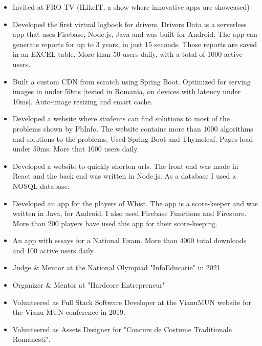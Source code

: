 \begin{itemize}
    \item Invited at PRO TV (ILikeIT, a show where innovative apps are showcased)
\end{itemize}

\begin{itemize}
    \item Developed the first virtual logbook for drivers.
    Drivers Data is a serverless app that uses Firebase, Node.js, Java and was built for Android.
    The app can generate reports for up to 3 years, in just 15 seconds.
    Those reports are saved in an EXCEL table.
    More than 50 users daily, with a total of 1000 active users.
\end{itemize}
\begin{itemize}
    \item Built a custom CDN from scratch using Spring Boot.
    Optimized for serving images in under 50ms [tested in Romania, on devices with latency under 10ms].
    Auto-image resizing and smart cache.
\end{itemize}
\begin{itemize}
    \item Developed a website where students can find solutions to most of the problems shown by PbInfo.
    The website contains more than 1000 algorithms and solutions to the problems.
    Used Spring Boot and Thymeleaf.
    Pages load under 50ms.
    More that 1000 users daily.
\end{itemize}
\begin{itemize}
    \item Developed a website to quickly shorten urls.
    The front end was made in React and the back end was written in Node.js.
    As a database I used a NOSQL database.
\end{itemize}
\begin{itemize}
    \item Developed an app for the players of Whist.
    The app is a score-keeper and was written in Java, for Android.
    I also used Firebase Functions and Firestore.
    More than 200 players have used this app for their score-keeping.
\end{itemize}
\begin{itemize}
    \item An app with essays for a National Exam.
    More than 4000 total downloads and 100 active users daily.
\end{itemize}
\begin{itemize}
    \item Judge \& Mentor at the National Olympiad "InfoEducatie" in 2021
    \item Organizer \& Mentor at "Hardcore Entrepreneur"
    \item Volunteered as Full Stack Software Developer at the VianuMUN website for the Vianu MUN conference in 2019.
    \item Volunteered as Assets Designer for "Concurs de Costume Traditionale Romanesti".
\end{itemize}